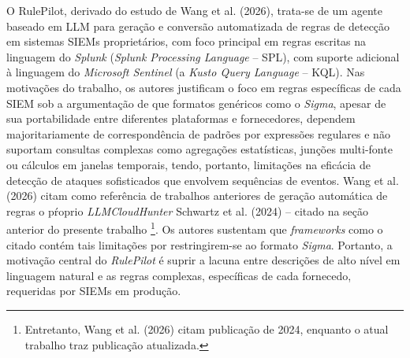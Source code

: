 O RulePilot, derivado do estudo de Wang et al. (2026), trata-se de um agente baseado em LLM para geração e conversão automatizada de regras de detecção em sistemas \gls{SIEM}s  proprietários, com foco principal em regras escritas na linguagem do \textit{Splunk} (\textit{Splunk Processing Language} -- SPL), com suporte adicional à linguagem do \textit{Microsoft Sentinel} (a \textit{Kusto Query Language} -- KQL). 
Nas motivações do trabalho, os autores justificam o foco em regras específicas de cada SIEM sob a argumentação de que formatos genéricos como o \textit{Sigma}, apesar de sua portabilidade entre diferentes plataformas e fornecedores, dependem majoritariamente de correspondência de padrões por expressões regulares e não suportam consultas complexas como agregações estatísticas, junções multi-fonte ou cálculos em janelas temporais, tendo, portanto, limitações na eficácia de detecção de ataques sofisticados que envolvem sequências de eventos. 
Wang et al. (2026) citam como referência de trabalhos anteriores de geração automática de regras o pŕoprio \textit{LLMCloudHunter} Schwartz et al. (2024) -- citado na seção anterior do presente trabalho
\footnote{Entretanto, Wang et al. (2026) citam publicação de 2024, enquanto o atual trabalho traz publicação atualizada.}.
Os autores sustentam que \textit{frameworks} como o citado contém tais limitações por restringirem-se ao formato \textit{Sigma}. 
Portanto, a motivação central do \textit{RulePilot} é suprir a lacuna entre descrições de alto nível em linguagem natural e as regras complexas, específicas de cada fornecedo, requeridas por SIEMs em produção.


